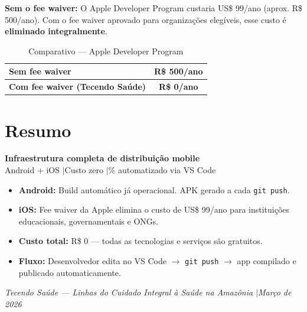 \documentclass[12pt, a4paper]{article}
\begin{document}
\begin{caixaalerta}
  \textbf{Sem o fee waiver:} O Apple Developer Program custaria US\$ 99/ano (aprox. R\$ 500/ano). Com o fee waiver aprovado para organiza\c{c}\~oes eleg\'iveis, esse custo \'e \textbf{eliminado integralmente}.
\end{caixaalerta}

\begin{table}[H]
\centering
\renewcommand{\arraystretch}{1.5}
\begin{tabularx}{0.7\textwidth}{|X|c|}
\hline
\rowcolor{red!10}
\textbf{Sem fee waiver} & \textbf{\color{vermelho}R\$ 500/ano} \\
\hline
\rowcolor{verdeC}
\textbf{Com fee waiver (Tecendo Sa\'ude)} & \textbf{\color{verde}R\$ 0/ano} \\
\hline
\end{tabularx}
\caption{Comparativo --- Apple Developer Program}
\end{table}


\section{Resumo}

\begin{tcolorbox}[
  colback=verdeC, colframe=verde,
  arc=10pt, boxrule=1.2pt,
  left=15pt, right=15pt, top=12pt, bottom=12pt
]
\begin{center}
  {\large\bfseries\color{verdeE}Infraestrutura completa de distribui\c{c}\~ao mobile}\\[6pt]
  {\color{cinza}Android + iOS \quad$|$\quad Custo zero \quad$|$\% automatizado via VS Code}
\end{center}
\end{tcolorbox}

\vspace{0.3cm}

\begin{itemize}
  \item \textbf{Android:} Build autom\'atico j\'a operacional. APK gerado a cada \texttt{git push}.
  \item \textbf{iOS:} Fee waiver da Apple elimina o custo de US\$ 99/ano para institui\c{c}\~oes educacionais, governamentais e ONGs.
  \item \textbf{Custo total:} R\$ 0 --- todas as tecnologias e servi\c{c}os s\~ao gratuitos.
  \item \textbf{Fluxo:} Desenvolvedor edita no VS Code $\rightarrow$ \texttt{git push} $\rightarrow$ app compilado e publicado automaticamente.
\end{itemize}

\vfill
\begin{center}
  \small\color{cinza}\textit{Tecendo Sa\'ude --- Linhas do Cuidado Integral \`a Sa\'ude na Amaz\^onia \quad$|$\quad Mar\c{c}o de 2026}
\end{center}
\end{document}
